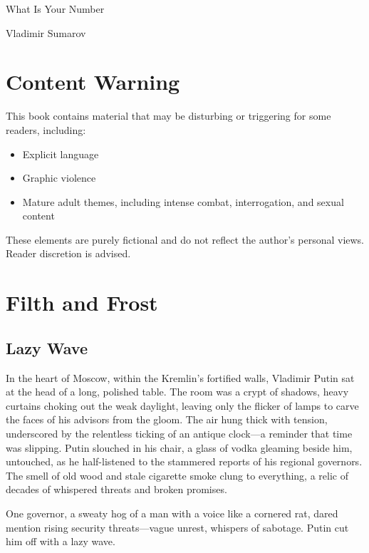 \documentclass[12pt]{book}
\begin{document}
\begin{titlepage}
    \centering
    \vspace*{3cm}
    {\fontsize{48}{60}\selectfont What Is Your Number\par} %
    \vspace{2cm}
    {\Large Vladimir Sumarov\par} %
\end{titlepage}
\clearpage

\chapter*{Content Warning}
This book contains material that may be disturbing or triggering for some readers, including:
\begin{itemize}
    \item Explicit language
    \item Graphic violence
    \item Mature adult themes, including intense combat, interrogation, and sexual content
\end{itemize}
These elements are purely fictional and do not reflect the author’s personal views. Reader discretion is advised.
\clearpage

\tableofcontents
\clearpage

\chapter{Filth and Frost}

\section{Lazy Wave}

In the heart of Moscow, within the Kremlin’s fortified walls, Vladimir Putin sat at the head of a long, polished table. The room was a crypt of shadows, heavy curtains choking out the weak daylight, leaving only the flicker of lamps to carve the faces of his advisors from the gloom. The air hung thick with tension, underscored by the relentless ticking of an antique clock—a reminder that time was slipping. Putin slouched in his chair, a glass of vodka gleaming beside him, untouched, as he half-listened to the stammered reports of his regional governors. The smell of old wood and stale cigarette smoke clung to everything, a relic of decades of whispered threats and broken promises.

One governor, a sweaty hog of a man with a voice like a cornered rat, dared mention rising security threats—vague unrest, whispers of sabotage. Putin cut him off with a lazy wave.
\end{document}
